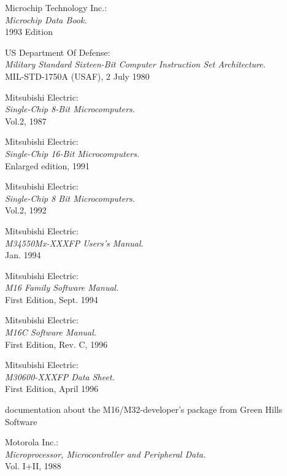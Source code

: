  Microchip Technology Inc.: \\
                    {\em Microchip Data Book.\/} \\
                    1993 Edition

 US Department Of Defense: \\
                  {\em Military Standard Sixteen-Bit Computer
                  Instruction Set Architecture.\/} \\
                  MIL-STD-1750A (USAF), 2 July 1980

 Mitsubishi Electric: \\
                {\em Single-Chip 8-Bit Microcomputers.\/} \\
                Vol.2, 1987

 Mitsubishi Electric: \\
                {\em Single-Chip 16-Bit Microcomputers.\/} \\
                Enlarged edition, 1991

 Mitsubishi Electric: \\
               {\em Single-Chip 8 Bit Microcomputers.\/} \\
               Vol.2, 1992

 Mitsubishi Electric: \\
                  {\em M34550Mx-XXXFP Users's Manual.\/} \\
                  Jan. 1994

 Mitsubishi Electric: \\
                 {\em M16 Family Software Manual.\/} \\
                 First Edition, Sept. 1994

 Mitsubishi Electric: \\
      	          {\em M16C Software Manual.\/} \\
                  First Edition, Rev. C, 1996

 Mitsubishi Electric: \\
                   {\em M30600-XXXFP Data Sheet.\/} \\
                   First Edition, April 1996

 documentation about the M16/M32-developer's package
                   from Green Hills Software

 Motorola Inc.: \\
                 {\em Microprocessor, Microcontroller and Peripheral
                 Data.\/} \\
		 Vol. I+II, 1988

